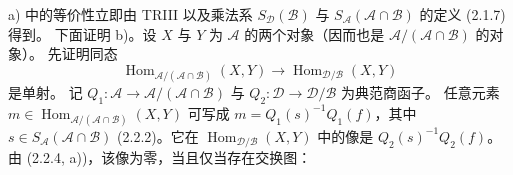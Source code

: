 a) 中的等价性立即由 TRIII 以及乘法系 $S_{\mathcal D}(\mathcal B)$ 与
$S_{\mathcal A}(\mathcal A\cap\mathcal B)$ 的定义 (2.1.7) 得到。
下面证明 b)。设 $X$ 与 $Y$ 为 $\mathcal A$ 的两个对象（因而也是
$\mathcal A/(\mathcal A\cap\mathcal B)$ 的对象）。
先证明同态
\[
 \operatorname{Hom}_{\mathcal A/(\mathcal A\cap\mathcal B)}(X,Y)
 \longrightarrow\operatorname{Hom}_{\mathcal D/\mathcal B}(X,Y)
\]
是单射。
记 $Q_1\colon\mathcal A\longrightarrow\mathcal A/(\mathcal A\cap\mathcal B)$
与 $Q_2\colon\mathcal D\longrightarrow\mathcal D/\mathcal B$ 为典范商函子。
任意元素 $m\in\operatorname{Hom}_{\mathcal A/(\mathcal A\cap\mathcal B)}(X,Y)$
可写成 $m=Q_1(s)^{-1}Q_1(f)$，其中
$s\in S_{\mathcal A}(\mathcal A\cap\mathcal B)$ (2.2.2)。它在
$\operatorname{Hom}_{\mathcal D/\mathcal B}(X,Y)$ 中的像是
$Q_2(s)^{-1}Q_2(f)$。
由 (2.2.4, a))，该像为零，当且仅当存在交换图：
\begin{center}
\end{center}
\endgroup
